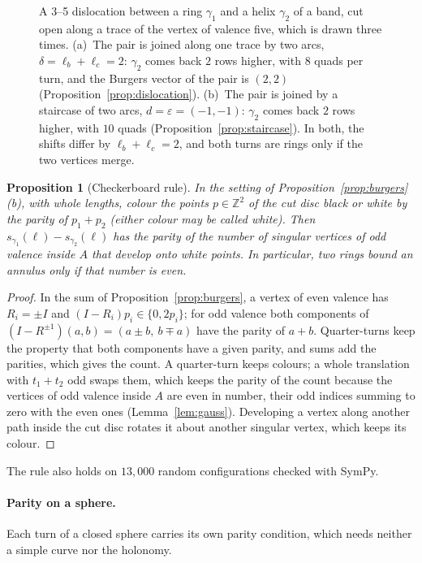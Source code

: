 \documentclass[11pt,a4paper]{article}
\newtheorem{proposition}{Proposition}
\newcommand{\Z}{\mathbb{Z}}
\newcommand{\shift}{s}
\begin{document}
\begin{figure}[t]
\centering

\caption{A 3--5 dislocation between a ring $\gamma_1$ and a helix $\gamma_2$
of a band, cut open along a trace of the vertex of valence five, which is
drawn three times. (a)~The pair is joined along one trace by two arcs, $\delta
= \ell_b + \ell_c = 2$: $\gamma_2$ comes back $2$ rows higher, with $8$
quads per turn, and the Burgers vector of the pair is $(2, 2)$
(Proposition~\ref{prop:dislocation}). (b)~The pair is joined by a staircase of
two arcs, $d = \varepsilon = (-1, -1)$: $\gamma_2$ comes back $2$ rows higher,
with $10$ quads (Proposition~\ref{prop:staircase}). In both, the shifts differ
by $\ell_b + \ell_c = 2$, and both turns are rings only if the two vertices
merge.}
\label{fig:dislocation}
\end{figure}

\begin{proposition}[Checkerboard rule]\label{prop:checkerboard}
In the setting of Proposition~\ref{prop:burgers}(b), with whole lengths,
colour the points $p \in \Z^2$ of the cut disc black or white by the parity of
$p_1 + p_2$ (either colour may be called white). Then $\shift_{\gamma_1}(\ell)
- \shift_{\gamma_2}(\ell)$ has the parity of the number of singular vertices
of odd valence inside $A$ that develop onto white points. In particular, two
rings bound an annulus only if that number is even.
\end{proposition}

\begin{proof}
In the sum of Proposition~\ref{prop:burgers}, a vertex of even valence has
$R_i = \pm I$ and $(I - R_i)p_i \in \{0, 2p_i\}$; for odd valence both
components of $(I - R^{\pm1})(a, b) = (a \pm b,\ b \mp a)$ have the parity of
$a + b$. Quarter-turns keep the property that both components have a given
parity, and sums add the parities, which gives the count. A quarter-turn keeps
colours; a whole translation with $t_1 + t_2$ odd swaps them, which keeps the
parity of the count because the vertices of odd valence inside $A$ are even in
number, their odd indices summing to zero with the even ones
(Lemma~\ref{lem:gauss}). Developing a vertex along another path inside the cut
disc rotates it about another singular vertex, which keeps its colour.
\end{proof}

The rule also holds on $13{,}000$ random configurations checked with SymPy.

\paragraph{Parity on a sphere.}
Each turn of a closed sphere carries its own parity condition, which needs
neither a simple curve nor the holonomy.
\end{document}
